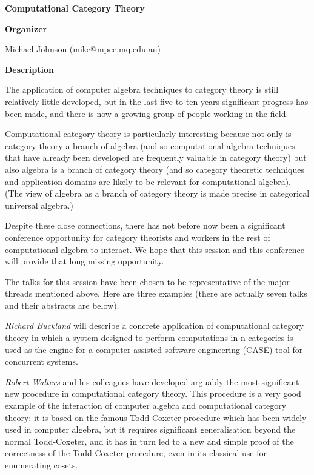 \begin{center}
{\LARGE \bf Computational Category Theory
}
\end{center}
\bigskip

\noindent
{\bf Organizer}

\medskip

Michael Johnson (mike@mpce.mq.edu.au)

\bigskip

\noindent
{\bf Description}
\medskip

The application of computer algebra techniques to category theory is still relatively little
developed, but in the last five to ten years significant progress has been made, and there is now a
growing group of people working in the field. 

Computational category theory is particularly interesting because not only is category theory a
branch of algebra (and so computational algebra techniques that have already been developed are
frequently valuable in category theory) but also algebra is a branch of category theory (and so
category theoretic techniques and application domains are likely to be relevant for computational
algebra). (The view of algebra as a branch of category theory is made precise in categorical
universal algebra.) 

Despite these close connections, there has not before now been a significant conference
opportunity for category theorists and workers in the rest of computational algebra to interact. We
hope that this session and this conference will provide that long missing opportunity. 

The talks for this session have been chosen to be representative of the major threads mentioned
above. Here are three examples (there are actually seven talks and their abstracts are below). 

{\em Richard Buckland} will describe a concrete application of computational category theory in which a
system designed to perform computations in n-categories is used as the engine for a computer
assisted software engineering (CASE) tool for concurrent systems. 

{\em Robert Walters} and his colleagues have developed arguably the most significant new procedure in
computational category theory. This procedure is a very good example of the interaction of
computer algebra and computational category theory: it is based on the famous Todd-Coxeter
procedure which has been widely used in computer algebra, but it requires significant
generalisation beyond the normal Todd-Coxeter, and it has in turn led to a new and simple proof
of the correctness of the Todd-Coxeter procedure, even in its classical use for enumerating cosets. 

